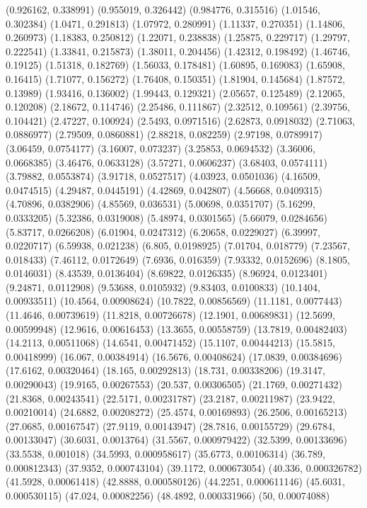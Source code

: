 {(0.926162, 0.338991)
(0.955019, 0.326442)
(0.984776, 0.315516)
(1.01546, 0.302384)
(1.0471, 0.291813)
(1.07972, 0.280991)
(1.11337, 0.270351)
(1.14806, 0.260973)
(1.18383, 0.250812)
(1.22071, 0.238838)
(1.25875, 0.229717)
(1.29797, 0.222541)
(1.33841, 0.215873)
(1.38011, 0.204456)
(1.42312, 0.198492)
(1.46746, 0.19125)
(1.51318, 0.182769)
(1.56033, 0.178481)
(1.60895, 0.169083)
(1.65908, 0.16415)
(1.71077, 0.156272)
(1.76408, 0.150351)
(1.81904, 0.145684)
(1.87572, 0.13989)
(1.93416, 0.136002)
(1.99443, 0.129321)
(2.05657, 0.125489)
(2.12065, 0.120208)
(2.18672, 0.114746)
(2.25486, 0.111867)
(2.32512, 0.109561)
(2.39756, 0.104421)
(2.47227, 0.100924)
(2.5493, 0.0971516)
(2.62873, 0.0918032)
(2.71063, 0.0886977)
(2.79509, 0.0860881)
(2.88218, 0.082259)
(2.97198, 0.0789917)
(3.06459, 0.0754177)
(3.16007, 0.073237)
(3.25853, 0.0694532)
(3.36006, 0.0668385)
(3.46476, 0.0633128)
(3.57271, 0.0606237)
(3.68403, 0.0574111)
(3.79882, 0.0553874)
(3.91718, 0.0527517)
(4.03923, 0.0501036)
(4.16509, 0.0474515)
(4.29487, 0.0445191)
(4.42869, 0.042807)
(4.56668, 0.0409315)
(4.70896, 0.0382906)
(4.85569, 0.036531)
(5.00698, 0.0351707)
(5.16299, 0.0333205)
(5.32386, 0.0319008)
(5.48974, 0.0301565)
(5.66079, 0.0284656)
(5.83717, 0.0266208)
(6.01904, 0.0247312)
(6.20658, 0.0229027)
(6.39997, 0.0220717)
(6.59938, 0.021238)
(6.805, 0.0198925)
(7.01704, 0.018779)
(7.23567, 0.018433)
(7.46112, 0.0172649)
(7.6936, 0.016359)
(7.93332, 0.0152696)
(8.1805, 0.0146031)
(8.43539, 0.0136404)
(8.69822, 0.0126335)
(8.96924, 0.0123401)
(9.24871, 0.0112908)
(9.53688, 0.0105932)
(9.83403, 0.0100833)
(10.1404, 0.00933511)
(10.4564, 0.00908624)
(10.7822, 0.00856569)
(11.1181, 0.0077443)
(11.4646, 0.00739619)
(11.8218, 0.00726678)
(12.1901, 0.00689831)
(12.5699, 0.00599948)
(12.9616, 0.00616453)
(13.3655, 0.00558759)
(13.7819, 0.00482403)
(14.2113, 0.00511068)
(14.6541, 0.00471452)
(15.1107, 0.00444213)
(15.5815, 0.00418999)
(16.067, 0.00384914)
(16.5676, 0.00408624)
(17.0839, 0.00384696)
(17.6162, 0.00320464)
(18.165, 0.00292813)
(18.731, 0.00338206)
(19.3147, 0.00290043)
(19.9165, 0.00267553)
(20.537, 0.00306505)
(21.1769, 0.00271432)
(21.8368, 0.00243541)
(22.5171, 0.00231787)
(23.2187, 0.00211987)
(23.9422, 0.00210014)
(24.6882, 0.00208272)
(25.4574, 0.00169893)
(26.2506, 0.00165213)
(27.0685, 0.00167547)
(27.9119, 0.00143947)
(28.7816, 0.00155729)
(29.6784, 0.00133047)
(30.6031, 0.0013764)
(31.5567, 0.000979422)
(32.5399, 0.00133696)
(33.5538, 0.001018)
(34.5993, 0.000958617)
(35.6773, 0.00106314)
(36.789, 0.000812343)
(37.9352, 0.000743104)
(39.1172, 0.000673054)
(40.336, 0.000326782)
(41.5928, 0.00061418)
(42.8888, 0.000580126)
(44.2251, 0.000611146)
(45.6031, 0.000530115)
(47.024, 0.00082256)
(48.4892, 0.000331966)
(50, 0.00074088)
}


